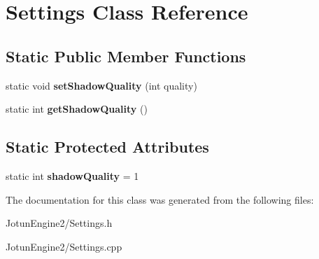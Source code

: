 \hypertarget{class_settings}{\section{Settings Class Reference}
\label{class_settings}
}
\subsection*{Static Public Member Functions}
\begin{DoxyCompactItemize}
\item 
\hypertarget{class_settings_a68abf3112059e840eb7f6f260f016f00}{static void {\bfseries set\-Shadow\-Quality} (int quality)}\label{class_settings_a68abf3112059e840eb7f6f260f016f00}

\item 
\hypertarget{class_settings_ae23d0bd93caaf3fecb968991379836ba}{static int {\bfseries get\-Shadow\-Quality} ()}\label{class_settings_ae23d0bd93caaf3fecb968991379836ba}

\end{DoxyCompactItemize}
\subsection*{Static Protected Attributes}
\begin{DoxyCompactItemize}
\item 
\hypertarget{class_settings_ab6ac3c9e85e7e97f134405239e81c474}{static int {\bfseries shadow\-Quality} = 1}\label{class_settings_ab6ac3c9e85e7e97f134405239e81c474}

\end{DoxyCompactItemize}


The documentation for this class was generated from the following files\-:\begin{DoxyCompactItemize}
\item 
Jotun\-Engine2/Settings.\-h\item 
Jotun\-Engine2/Settings.\-cpp\end{DoxyCompactItemize}
